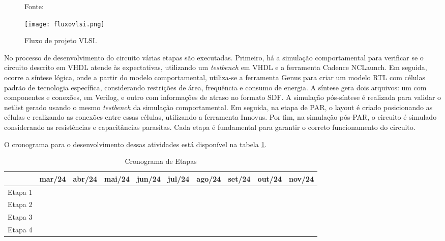 \begin{figure}[ht!]
  \centering
  \captionsetup{justification=centering}
  \caption*{Fonte: \cite{CMOS2010}}
  \texttt{[image: fluxovlsi.png]}
  \caption{Fluxo de projeto VLSI.}
  \label{fig:CMOS2010}
\end{figure}

No processo de desenvolvimento do circuito várias etapas são executadas. Primeiro, há a simulação comportamental para verificar se o circuito descrito em VHDL atende às expectativas, utilizando um \textit{testbench} em VHDL e a ferramenta Cadence NCLaunch. Em seguida, ocorre a síntese lógica, onde a partir do modelo comportamental, utiliza-se a ferramenta Genus para criar um modelo RTL com células padrão de tecnologia específica, considerando restrições de área, frequência e consumo de energia. A síntese gera dois arquivos: um com componentes e conexões, em Verilog, e outro com informações de atraso no formato SDF. A simulação pós-síntese é realizada para validar o netlist gerado usando o mesmo \textit{testbench} da simulação comportamental. Em seguida, na etapa de PAR, o layout é criado posicionando as células e realizando as conexões entre essas células, utilizando a ferramenta Innovus. Por fim, na simulação pós-PAR, o circuito é simulado considerando as resistências e capacitâncias parasitas. Cada etapa é fundamental para garantir o correto funcionamento do circuito.

O cronograma para o desenvolvimento dessas atividades está disponível na tabela \ref{tab:cronograma}.

\begin{table}[ht!]
  \centering
  \renewcommand{\arraystretch}{0.8} %
  \setlength{\tabcolsep}{4pt} %
  \begin{tabular}{|l|c|c|c|c|c|c|c|c|c|}
  \hline
  & mar/24 & abr/24 & mai/24 & jun/24 & jul/24 & ago/24 & set/24 & out/24 & nov/24\\
  \hline
  Etapa 1 & \cellcolor{yellow} & \cellcolor{yellow} &&&&&&& \\
  \rowcolor{gray!20} %
  Etapa 2 && \cellcolor{yellow} & \cellcolor{yellow} & \cellcolor{yellow} &&&&&\\
  Etapa 3 &&& \cellcolor{yellow} & \cellcolor{yellow} & \cellcolor{yellow} & \cellcolor{yellow} &&&\\ 
  \rowcolor{gray!20} %
  Etapa 4 &&&&&& \cellcolor{yellow}& \cellcolor{yellow} & \cellcolor{yellow} & \cellcolor{yellow}\\ 
  \hline
\end{tabular}
\caption{Cronograma de Etapas}
\label{tab:cronograma}
\end{table}
  